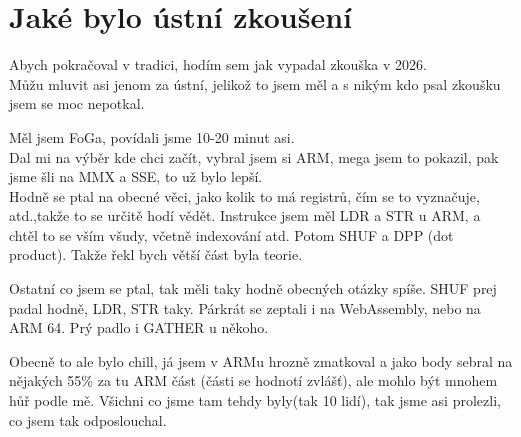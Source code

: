 \documentclass[
]{cz_sablona}
\begin{document}
\newpage
\section{Jaké bylo ústní zkoušení}
Abych pokračoval v tradici, hodím sem jak vypadal zkouška v 2026.\\
Můžu mluvit asi jenom za ústní, jelikož to jsem měl a s nikým kdo psal
zkoušku jsem se moc nepotkal.

Měl jsem FoGa, povídali jsme 10-20 minut asi.\\
Dal mi na výběr kde chci začít, vybral jsem si ARM, mega jsem to pokazil,
pak jsme šli na MMX a SSE, to už bylo lepší.\\

Hodně se ptal na obecné věci, jako kolik to má registrů, čím se to vyznačuje,
atd.,takže to se určitě hodí vědět.
Instrukce jsem měl LDR a STR u ARM, a chtěl to se vším všudy, včetně
indexování atd. Potom SHUF a DPP (dot product). Takže řekl bych
větší část byla teorie.

Ostatní co jsem se ptal, tak měli taky hodně obecných otázky spíše.
SHUF prej padal hodně, LDR, STR taky. Párkrát se zeptali i na WebAssembly,
nebo na ARM 64. Prý padlo i GATHER u někoho.

Obecně to ale bylo chill, já jsem v ARMu hrozně zmatkoval a jako body
sebral na nějakých 55\% za tu ARM část (části se hodnotí zvlášť),
ale mohlo být mnohem hůř podle mě.
Všichni co jsme tam tehdy byly(tak 10 lidí), tak jsme asi prolezli, co jsem tak odposlouchal.
\end{document}
